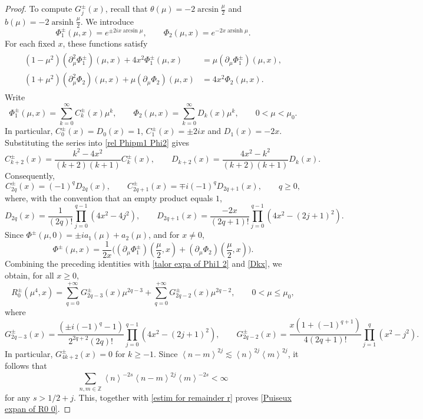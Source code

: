 \documentclass[10pt,a4paper]{amsart}
\newcommand\Z{\mathbb{Z}}
\numberwithin{equation}{section}
\begin{document}
\begin{proof}
To compute $G_j^{\pm}(x)$, recall that $\theta(\mu)=-2\arcsin\frac{\mu}{2}$ and $b(\mu)=-2\operatorname{arsinh}\frac{\mu}{2}$. We introduce 
$$\Phi^{\pm}_1(\mu,x)=e^{\pm 2ix\arcsin{\mu}},\qquad \Phi_2(\mu,x)=e^{-2x\operatorname{arsinh}\mu}.$$ 
For each fixed $x$, these functions satisfy
\begin{align}\label{rel Phipm1 Phi2}
\begin{split}
(1-\mu^2)(\partial^2_\mu\Phi^{\pm}_1)(\mu,x)+4x^2\Phi^{\pm}_1(\mu,x)&=\mu (\partial_\mu\Phi^{\pm}_1)(\mu,x),\\
(1+\mu^2)(\partial^2_\mu\Phi_2)(\mu,x)+\mu(\partial_\mu\Phi_2)(\mu,x)&=4x^2\Phi_2(\mu,x).
\end{split}
\end{align}
Write
\begin{equation}\label{talor expa of Phi1 2}
\Phi^{\pm}_1(\mu,x)=\sum\limits_{k=0}^{\infty}C^{\pm}_k(x)\mu^k,\qquad \Phi_2(\mu,x)=\sum\limits_{k=0}^{\infty}D_k(x)\mu^k,\qquad 0<\mu<\mu_0.
\end{equation}
In particular, $C^{\pm}_0(x)=D_0(x)=1$, $C^{\pm}_1(x)=\pm 2ix$ and $D_1(x)=-2x$. Substituting the series into  \eqref{rel Phipm1 Phi2} gives
\[
C_{k+2}^{\pm}(x)=\frac{k^2-4x^2}{(k+2)(k+1)}C_k^{\pm}(x),
\qquad
D_{k+2}(x)=\frac{4x^2-k^2}{(k+2)(k+1)}D_k(x).
\]
Consequently,
\[
C_{2q}^{\pm}(x)=(-1)^qD_{2q}(x),
\qquad
C_{2q+1}^{\pm}(x)=\mp i(-1)^qD_{2q+1}(x),
\qquad q\geq0,
\]
where, with the convention that an empty product equals $1$,
\begin{equation}\label{Dkx}
   D_{2q}(x)=
       \frac{1}{(2q)!}\prod\limits_{j=0}^{q-1}(4x^2-4j^2),\qquad D_{2q+1}(x)=
       \frac{-2x}{(2q+1)!}\prod\limits_{j=0}^{q-1}(4x^2-(2j+1)^2).
\end{equation}
Since $\Phi^{\pm}(\mu,0)=\pm ia_1(\mu)+a_2(\mu)$, and for $x\neq0$, 
$$\Phi^{\pm}(\mu,x)=
    \frac{1}{2x}\big((\partial_{\mu}\Phi^{\pm}_1)(\frac{\mu}{2},x)+(\partial_{\mu}\Phi_2)(\frac\mu2,x)\big).$$ 
Combining the preceding identities with \eqref{talor expa of Phi1 2} and \eqref{Dkx}, we obtain, for all $x\geq0$,
\begin{equation*}
R^{\pm}_0(\mu^4,x)=\sum\limits_{q=0}^{+\infty} G^{\pm}_{2q-3}(x)\mu^{2q-3}+\sum\limits_{q=0}^{+\infty} G^\pm_{2q-2}(x)\mu^{2q-2}, \qquad 0<\mu\leq \mu_0,
\end{equation*}
where
\begin{equation*}
   G^{\pm}_{2q-3}(x)= \frac{(\pm i(-1)^q-1)}{2^{2q+2}(2q)!}\prod\limits_{j=0}^{q-1}(4x^2-(2j+1)^2),\qquad  G^\pm_{2q-2}(x)=\frac{x(1+(-1)^{q+1})}{4(2q+1)!}\prod\limits_{j=1}^{q}(x^2-j^2).
\end{equation*}
In particular, $G^\pm_{4k+2}(x)=0$ for $k\geq-1$. Since $\left<n-m\right>^{2j}\lesssim\left<n\right>^{2j}\left<m\right>^{2j}$, it follows that $$\sum\limits_{n,m\in\Z}\left<n\right>^{-2s}\left<n-m\right>^{2j}\left<m\right>^{-2s}<\infty$$ for any $s>1/2+j$. This, together with \eqref{estim for remainder r} proves \eqref{Puiseux expan of R0 0}.


\end{proof}
\end{document}

